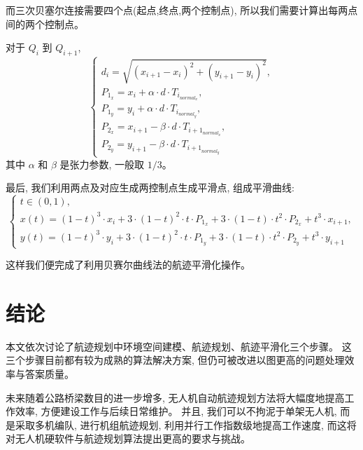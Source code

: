 \documentclass[oneside,UTF8]{ctexart}
\numberwithin{figure}{section} %
\begin{document}
而三次贝塞尔连接需要四个点(起点,终点,两个控制点),
所以我们需要计算出每两点间的两个控制点。

对于 $Q_i$ 到 $Q_{i+1}$,
\begin{equation}
  \begin{cases}
    d_i=\sqrt{(x_{i+1}-x_i)^2 + (y_{i+1}-y_i)^2} ,\\
    P_{1_x} = x_i + \alpha \cdot d\cdot T_{i_{{normal}_x}} ,\\
    P_{1_y} = y_i + \alpha \cdot d\cdot T_{i_{{normal}_y}} ,\\
    P_{2_x} = x_{i+1} - \beta \cdot d\cdot T_{{i+1}_{{normal}_x}} ,\\
    P_{2_y} = y_{i+1} - \beta \cdot d\cdot T_{{i+1}_{{normal}_y}}
  \end{cases}
  \nonumber
\end{equation}
其中 $\alpha$ 和 $\beta$ 是张力参数,
一般取 $1/3$。

最后,
我们利用两点及对应生成两控制点生成平滑点,
组成平滑曲线:
\begin{equation}
  \begin{cases}
    t \in (0,1) ,\\
    x(t) = (1-t)^3\cdot x_i + 3\cdot (1-t)^2\cdot t\cdot P_{1_x} + 3\cdot(1-t)\cdot t^2\cdot P_{2_x}+t^3\cdot x_{i+1} ,\\
    y(t) = (1-t)^3\cdot y_i + 3\cdot (1-t)^2\cdot t\cdot P_{1_y} + 3\cdot(1-t)\cdot t^2\cdot P_{2_y}+t^3\cdot y_{i+1}
  \end{cases}
  \nonumber
\end{equation}

这样我们便完成了利用贝赛尔曲线法的航迹平滑化操作。
\newpage\section{结论}
本文依次讨论了航迹规划中环境空间建模、航迹规划、航迹平滑化三个步骤。
这三个步骤目前都有较为成熟的算法解决方案,
但仍可被改进以图更高的问题处理效率与答案质量。

未来随着公路桥梁数目的进一步增多,
无人机自动航迹规划方法将大幅度地提高工作效率,
方便建设工作与后续日常维护。
并且,
我们可以不拘泥于单架无人机,
而是采取多机编队,
进行机组航迹规划,
利用并行工作指数级地提高工作速度,
而这将对无人机硬软件与航迹规划算法提出更高的要求与挑战。
\end{document}
